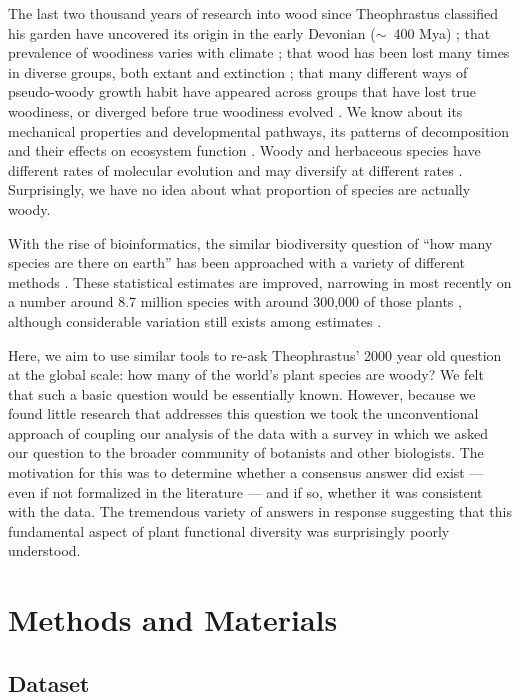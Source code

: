 \documentclass[12pt]{article}
\begin{document}
The last two thousand years of research into wood since Theophrastus
classified his garden have uncovered its origin in the early Devonian
($\sim$~400 Mya) \citep{gerrienne2011simple}; that prevalence of
woodiness varies with climate \citep{Molesheihgt}; that wood has been
lost many times in diverse groups, both extant and extinction
\citep{judd1994}; that many different ways of pseudo-woody growth
habit have appeared across groups that have lost true woodiness, or
diverged before true woodiness evolved \citep{Cornwellwood}.  We know
about its mechanical properties and developmental pathways, its
patterns of decomposition and their effects on ecosystem function
\citep{Cornwellwood}.  Woody and herbaceous species have different
rates of molecular evolution and may diversify at different rates
\citep{SmithDonoghue}.
%
Surprisingly, we have no idea about what proportion of species are
actually woody.

With the rise of bioinformatics, the similar biodiversity question of
``how many species are there on earth'' has been approached with a
variety of different methods \citep{may1988many,erwin1991many,
  stork1993many, joppa2010, costello2011, mora2011plos}.  These
statistical estimates are improved, narrowing in most recently on a
number around 8.7 million species with around 300,000 of those plants
\citep{mora2011plos}, although considerable variation still exists
among estimates \citep{costello2011}.

Here, we aim to use similar tools to re-ask Theophrastus' 2000 year
old question at the global scale: how many of the world's plant
species are woody?
%
We felt that such a basic question would be essentially known.
However, because we found little research that addresses this question
we took the unconventional approach of coupling our analysis of the
data with a survey in which we asked our question to the broader
community of botanists and other biologists.  The motivation for this
was to determine whether a consensus answer did exist --- even if not
formalized in the literature --- and if so, whether it was consistent
with the data.
% 
The tremendous variety of answers in response suggesting that this
fundamental aspect of plant functional diversity was surprisingly
poorly understood.

\section{Methods and Materials}

\subsection{Dataset}
\end{document}
